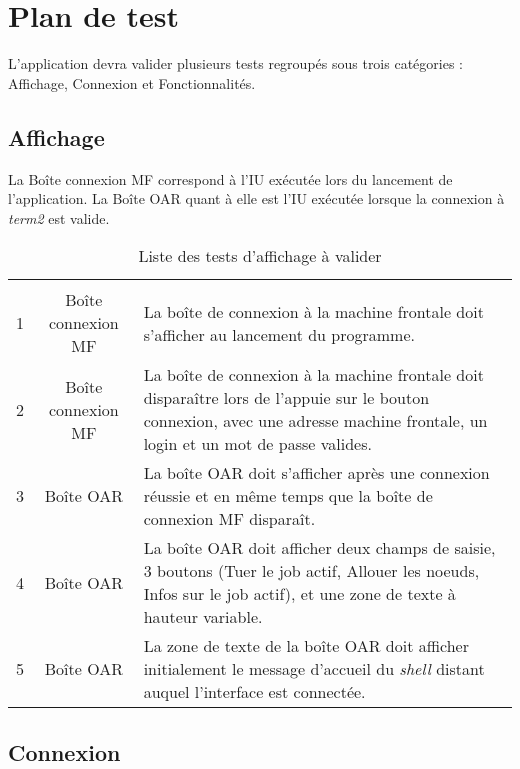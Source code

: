 
\section{Plan de test}
\label{sec:plan-de-test}

\par L'application devra valider plusieurs tests regroupés sous trois catégories : Affichage, Connexion et Fonctionnalités.

\subsection{Affichage}
\label{sec:affichage}

\par La Boîte connexion MF correspond à l'IU exécutée lors du lancement de l'application. La Boîte OAR quant à elle est l'IU exécutée lorsque la connexion à \emph{term2} est valide.

\begin{table}[h!]
  \centering
  \begin{tabular}[h!]{|c|c|p{10cm}|}
    \hline \\
    1 & Boîte connexion MF & La boîte de connexion à la machine frontale doit s'afficher au lancement du programme. \\
    2 & Boîte connexion MF & La boîte de connexion à la machine frontale doit disparaître lors de l'appuie sur le bouton connexion, avec une adresse machine frontale, un login et un mot de passe valides.\\
    3 & Boîte OAR & La boîte OAR doit s'afficher après une connexion réussie et en même temps que la boîte de connexion MF disparaît. \\
    4 & Boîte OAR & La boîte OAR doit afficher deux champs de saisie, 3 boutons (Tuer le job actif, Allouer les noeuds, Infos sur le job actif), et une zone de texte à hauteur variable. \\
    5 & Boîte OAR & La zone de texte de la boîte OAR doit afficher initialement le message d'accueil du \emph{shell} distant auquel l'interface est connectée. \\

    \hline    
  \end{tabular}
  \caption{Liste des tests d'affichage à valider}
  \label{tab:tests_affichage}
\end{table}

\subsection{Connexion}
\label{sec:connexion}

